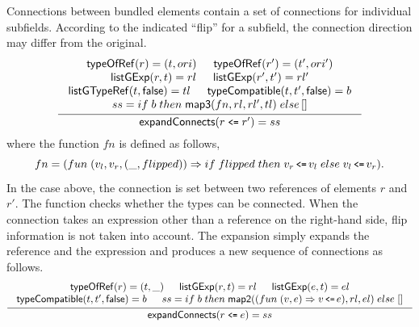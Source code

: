 Connections between bundled elements contain a set of connections for
individual subfields. According to the indicated ``flip'' for a subfield, the
connection direction may differ from the original.
\begin{gather*}
   \label{expand-cnct-ref}
   \infer[]
         {\seqq{\expandconnects (r\;\mbox{\prettyll{<=}}\;r') = ss}}
         {\begin{array}{c}
             \typeofref(r) = (t, ori) \hspace{15pt} \typeofref(r') = (t',ori') \\ 
             \listgexp(r, t) = rl \hspace{15pt} \listgexp(r', t') = rl'  \\
            \listgtyperef(t, \lfalse) = tl \hspace{15pt} \typecompatible(t, t', \lfalse) = b \\
             ss = if\;b\; then\; \fmapthree(fn, rl,rl',tl)\;else\,[]
           \end{array}
         }
\end{gather*}
where the function $fn$ is defined as follows,
\[
fn =  (fun\; (v_l,v_r,(\_,flipped)) \Rightarrow if\;flipped\; then\;v_r\, \mbox{\prettyll{ <= }}\, v_l\; else\;v_l\, \mbox{\prettyll{ <= }}\,v_r).
\]
%
In the case above, the connection is set between two references of
elements $r$ and $r'$. The function {\typecompatible} checks whether the
types can be connected. When the connection takes an
expression other than a reference on the right-hand side, flip
information is not taken into account. The expansion simply expands
the reference and the expression and produces a new sequence of
connections as follows.
%
\begin{gather*}
   \label{expand-cnct-expr}
   \infer[]
         {\seqq{\expandconnects (r\;\mbox{\prettyll{<=}}\;e) = ss}}
         {\begin{array}{c}
             \typeofref(r) = (t,\_) \hspace{15pt} \listgexp(r, t) = rl \hspace{15pt} \listgexp(e, t) = el \\
            \typecompatible(t,t', \lfalse) = b \hspace{15pt} ss = if\;b\; then\; \fmaptwo((fun\; (v,e) \Rightarrow v\, \mbox{\prettyll{ <= }}\, e), rl,el)\; else\;[]
           \end{array}
         }
\end{gather*}


